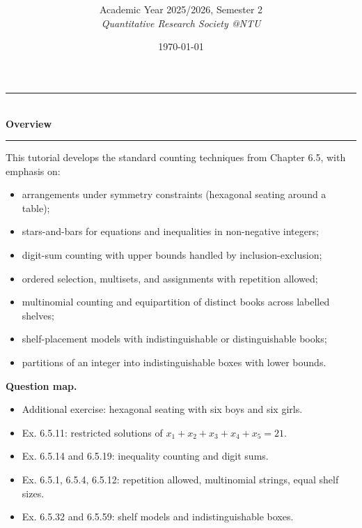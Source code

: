 \documentclass[12pt]{article}
\title{
\CourseCode \CourseName \\[0.3em]
\large \DocType
}
\author{
  Academic Year 2025/2026, Semester 2 \\[0.25em]
  \textit{Quantitative Research Society @NTU}
}
\date{\today}
\begin{document}
\maketitle
\thispagestyle{plainfirst}
\pagestyle{main}

\begin{center}
  \rule{0.82\textwidth}{0.4pt}\\[4pt]
  \textbf{Overview}\\[2pt]
  \rule{0.82\textwidth}{0.4pt}
\end{center}

\noindent
This tutorial develops the standard counting techniques from Chapter 6.5, with emphasis on:
\begin{itemize}[leftmargin=*]
  \item arrangements under symmetry constraints (hexagonal seating around a table);
  \item stars-and-bars for equations and inequalities in non-negative integers;
  \item digit-sum counting with upper bounds handled by inclusion-exclusion;
  \item ordered selection, multisets, and assignments with repetition allowed;
  \item multinomial counting and equipartition of distinct books across labelled shelves;
  \item shelf-placement models with indistinguishable or distinguishable books;
  \item partitions of an integer into indistinguishable boxes with lower bounds.
\end{itemize}

\noindent
\textbf{Question map.}
\begin{itemize}[leftmargin=*]
  \item Additional exercise: hexagonal seating with six boys and six girls.
  \item Ex. 6.5.11: restricted solutions of $x_1+x_2+x_3+x_4+x_5=21$.
  \item Ex. 6.5.14 and 6.5.19: inequality counting and digit sums.
  \item Ex. 6.5.1, 6.5.4, 6.5.12: repetition allowed, multinomial strings, equal shelf sizes.
  \item Ex. 6.5.32 and 6.5.59: shelf models and indistinguishable boxes.
\end{itemize}

\newpage
\tableofcontents
\newpage
\end{document}
